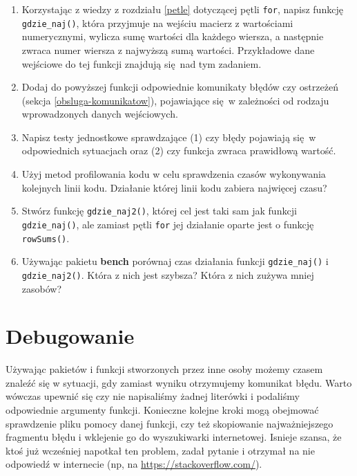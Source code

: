 \documentclass[paper=6in:9in,pagesize=pdftex,headinclude=on,footinclude=on,10pt]{scrbook}
\begin{document}
\begin{enumerate}
\def\labelenumi{\arabic{enumi})}
\item
  Korzystając z wiedzy z rozdziału \ref{petle} dotyczącej pętli \texttt{for}, napisz funkcję \texttt{gdzie\_naj()}, która przyjmuje na wejściu macierz z wartościami numerycznymi, wylicza sumę wartości dla każdego wiersza, a następnie zwraca numer wiersza z najwyższą sumą wartości.
  Przykładowe dane wejściowe do tej funkcji znajdują się~nad tym zadaniem.
\item
  Dodaj do powyższej funkcji odpowiednie komunikaty błędów czy ostrzeżeń (sekcja \ref{obsluga-komunikatow}), pojawiające się~w zależności od rodzaju wprowadzonych danych wejściowych.
\item
  Napisz testy jednostkowe sprawdzające (1) czy błędy pojawiają się~w odpowiednich sytuacjach oraz (2) czy funkcja zwraca prawidłową wartość.
\item
  Użyj metod profilowania kodu w celu sprawdzenia czasów wykonywania kolejnych linii kodu.
  Działanie której linii kodu zabiera najwięcej czasu?
\item
  Stwórz funkcję \texttt{gdzie\_naj2()}, której cel jest taki sam jak funkcji \texttt{gdzie\_naj()}, ale zamiast pętli \texttt{for} jej działanie oparte jest o funkcję \texttt{rowSums()}.
\item
  Używając pakietu \textbf{bench} porównaj czas działania funkcji \texttt{gdzie\_naj()} i \texttt{gdzie\_naj2()}.
  Która z nich jest szybsza?
  Która z nich zużywa mniej zasobów?
\end{enumerate}

\hypertarget{debugging}{%
\chapter{Debugowanie}\label{debugging}}

Używając pakietów i funkcji stworzonych przez inne osoby możemy czasem znaleźć się w sytuacji, gdy zamiast wyniku otrzymujemy komunikat błędu.
Warto wówczas upewnić się czy nie napisaliśmy żadnej literówki i podaliśmy odpowiednie argumenty funkcji.
Konieczne kolejne kroki mogą obejmować sprawdzenie pliku pomocy danej funkcji, czy też skopiowanie najważniejszego fragmentu błędu i wklejenie go do wyszukiwarki internetowej.
Isnieje szansa, że ktoś już wcześniej napotkał ten problem, zadał pytanie i otrzymał na nie odpowiedź w internecie (np, na \url{https://stackoverflow.com/}).
\end{document}
